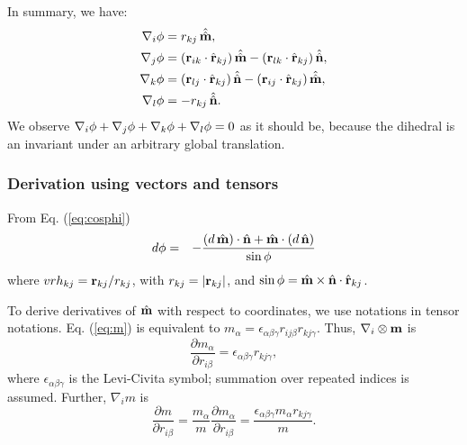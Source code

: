 \documentclass{article}
\begin{document}
In summary, we have:
\begin{equation}
\begin{split}
\nabla_i \phi   &=  r_{kj} \, \hat{\hat{\mathbf{m}}}, \\
\nabla_j \phi   &=  (\mathbf{r}_{ik} \cdot \hat{\mathbf{r}}_{kj}) \, \hat{\hat{\mathbf{m}}} - (\mathbf{r}_{lk} \cdot \hat{\mathbf{r}}_{kj}) \, \hat{\hat{\mathbf{n}}}, \\
\nabla_k \phi   &=  (\mathbf{r}_{lj} \cdot \hat{\mathbf{r}}_{kj}) \, \hat{\hat{\mathbf{n}}} - (\mathbf{r}_{ij} \cdot \hat{\mathbf{r}}_{kj}) \, \hat{\hat{\mathbf{m}}}, \\
\nabla_l \phi   &= -r_{kj} \, \hat{\hat{\mathbf{n}}}.
\end{split}
\label{eq:gradall}
\end{equation}
We observe $\nabla_i \phi + \nabla_j \phi + \nabla_k \phi + \nabla_l \phi = 0$ as it should be, 
because the dihedral is an invariant under an arbitrary global translation.




\subsubsection{Derivation using vectors and tensors}
From Eq. (\ref{eq:cosphi})
\begin{eqnarray*}
d \phi  &=&  -\frac{ (d\,\hat{\mathbf{m}}) \cdot \hat{\mathbf{n}} + \hat{\mathbf{m}} \cdot (d\,\hat{\mathbf{n}}) } {\sin \phi} 
\end{eqnarray*}
where 
$vrh_{kj} = \mathbf{r}_{kj}/r_{kj}$, with $r_{kj} = |\mathbf{r}_{kj}|$,
and 
$\sin\phi = \hat{\mathbf{m}} \times \hat{\mathbf{n}} \cdot \hat{\mathbf{r}}_{kj} $.

To derive derivatives of $\hat{\mathbf{m}}$ with respect to coordinates, 
we use notations in tensor notations.
Eq. (\ref{eq:m}) is equivalent to
$m_\alpha = \epsilon_{\alpha \beta \gamma} r_{ij \beta} r_{kj \gamma}$.
%
Thus, 
$\nabla_i \otimes \mathbf{m}$
is 
\begin{equation}
  \frac {\partial m_\alpha} {\partial r_{i \beta}} 
  = \epsilon_{\alpha \beta \gamma} r_{k j \gamma},
  \label{eq:dmadrib}
\end{equation}
where $\epsilon_{\alpha \beta \gamma}$ is the Levi-Civita symbol;
%
summation over repeated indices is assumed.
%
Further,
$\nabla_i m$ is 
\begin{equation}
    \frac {\partial m} {\partial r_{i  \beta}} 
  = \frac {m_\alpha}{m} \frac {\partial m_\alpha} {\partial r_{i \beta}} 
  = \frac {\epsilon_{\alpha \beta \gamma} m_\alpha r_{k j \gamma}}{m}.
  \label{eq:dmdrib}
\end{equation}
%
\end{document}
